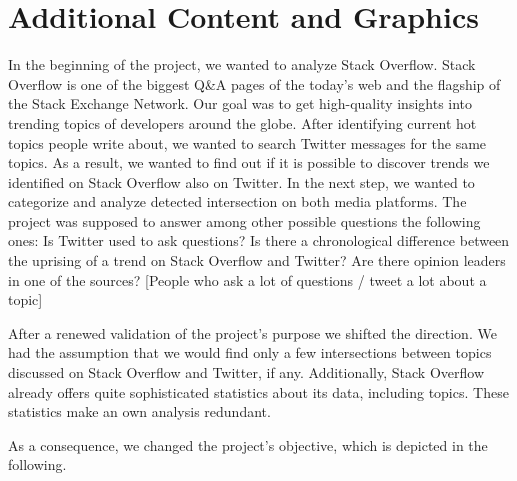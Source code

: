 
\chapter{Additional Content and Graphics}
\label{cha:appendix}
In the beginning of the project, we wanted to analyze Stack Overflow. Stack Overflow is one of the biggest Q\&A pages of the today’s web and the flagship of the Stack Exchange Network.
Our goal was to get high-quality insights into trending topics of developers around the globe.
After identifying current hot topics people write about, we wanted to search Twitter messages for the same topics. As a result, we wanted to find out if it is possible to discover trends we identified on Stack Overflow also on Twitter. In the next step, we wanted to categorize and analyze detected intersection on both media platforms. The project was supposed to answer among other possible questions the following ones:
Is Twitter used to ask questions?
Is there a chronological difference between the uprising of a trend on Stack Overflow and Twitter?
Are there opinion leaders in one of the sources? [People who ask a lot of questions / tweet a lot about a topic]

After a renewed validation of the project’s purpose we shifted the direction. We had the assumption that we would find only a few intersections between topics discussed on Stack Overflow and Twitter, if any. Additionally, Stack Overflow already offers quite sophisticated statistics about its data, including topics. These statistics make an own analysis redundant.

As a consequence, we changed the project’s objective, which is depicted in the following.